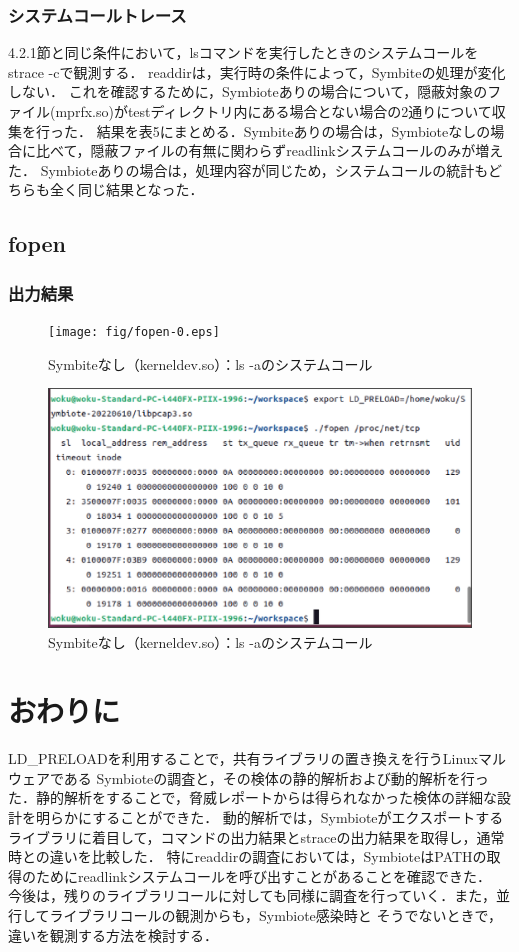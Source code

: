 \documentclass[submit,techreq,noauthor]{eco}	%
\begin{document}
\subsubsection{システムコールトレース}
4.2.1節と同じ条件において，lsコマンドを実行したときのシステムコールをstrace -cで観測する．
readdirは，実行時の条件によって，Symbiteの処理が変化しない．
これを確認するために，Symbioteありの場合について，隠蔽対象のファイル(mprfx.so)がtestディレクトリ内にある場合とない場合の2通りについて収集を行った．
結果を表5にまとめる．Symbiteありの場合は，Symbioteなしの場合に比べて，隠蔽ファイルの有無に関わらずreadlinkシステムコールのみが増えた．
Symbioteありの場合は，処理内容が同じため，システムコールの統計もどちらも全く同じ結果となった．

\subsection{fopen}
\subsubsection{出力結果}

\begin{figure}[t]
	\centering
  \texttt{[image: fig/fopen-0.eps]}
	\caption{Symbiteなし（kerneldev.so）：ls -aのシステムコール}
	\label{fig:fopen0}
\end{figure}

\begin{figure}[t]
	\centering
  \includegraphics[width=12cm]{fig/fopen-1.eps}
	\caption{Symbiteなし（kerneldev.so）：ls -aのシステムコール}
	\label{fig:fopen1}
\end{figure}


\section{おわりに}
LD\_PRELOADを利用することで，共有ライブラリの置き換えを行うLinuxマルウェアである
Symbioteの調査と，その検体の静的解析および動的解析を行った．静的解析をすることで，脅威レポートからは得られなかった検体の詳細な設計を明らかにすることができた．
動的解析では，Symbioteがエクスポートするライブラリに着目して，コマンドの出力結果とstraceの出力結果を取得し，通常時との違いを比較した．
特にreaddirの調査においては，SymbioteはPATHの取得のためにreadlinkシステムコールを呼び出すことがあることを確認できた．\\
今後は，残りのライブラリコールに対しても同様に調査を行っていく．また，並行してライブラリコールの観測からも，Symbiote感染時と
そうでないときで，違いを観測する方法を検討する．

\setlength\baselineskip{12pt}
{\small
	
	
}
\end{document}
